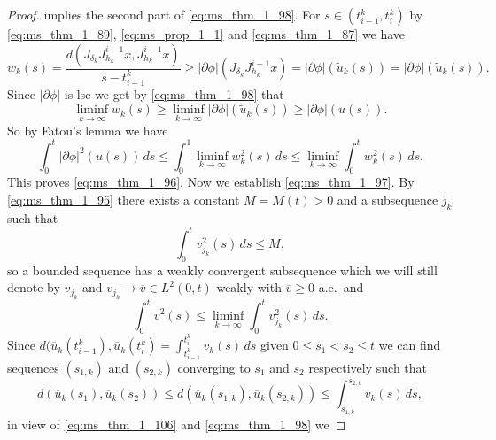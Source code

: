 \documentclass[a4paper,11pt, leqno]{scrreprt} %
\renewcommand{\leq}{\leqslant}
\renewcommand{\leq}{\leqslant}
\renewcommand{\geq}{\geqslant}
\theoremstyle{change}
\theoremstyle{nonumberplain}
\newtheorem{proof}{Proof}
\begin{document}
\begin{proof}
  implies the second part of \eqref{eq:ms_thm_1_98}. For $s \in (t_{i
    - 1}^k, t_i^k)$ by \eqref{eq:ms_thm_1_89}, \eqref{eq:ms_prop_1_1}
  and \eqref{eq:ms_thm_1_87} we have
  \begin{equation}
    \label{eq:ms_thm_1_103}
    w_k(s) = \frac{d(J_{\delta_k} J_{h_k}^{i - 1} x, J_{h_k}^{i - 1} x)}{s - t_{i -
        1}^k} \geq |\partial \phi|(J_{\delta_k} J_{h_k}^{i - 1} x) =
    |\partial \phi|(\tilde u_k(s)) = |\partial \phi|(\tilde u_k(s)).
  \end{equation}
  Since $|\partial \phi|$ is lsc we get by \eqref{eq:ms_thm_1_98} that 
  \begin{equation}
    \label{eq:ms_thm_1_104}
    \liminf_{k \to \infty} w_k(s) \geq \liminf_{k \to \infty}
    |\partial \phi|(\tilde u_k(s)) \geq |\partial \phi|(u(s)).
  \end{equation}
  So by Fatou's lemma we have
  \begin{equation}
    \label{eq:ms_thm_1_105}
    \int_0^t |\partial \phi|^2(u(s)) \, ds \leq \int_0^1 \liminf_{k
      \to \infty} w_k^2(s) \, ds \leq \liminf_{k \to \infty} \int_0^t
    w_k^2(s) \, ds.
  \end{equation}
  This proves \eqref{eq:ms_thm_1_96}. Now we establish
  \eqref{eq:ms_thm_1_97}. By \eqref{eq:ms_thm_1_95} there exists a
  constant $M = M(t) > 0$ and a subsequence $j_k$ such that
  \begin{equation}
    \label{eq:ms_thm_1_106}
    \int_0^t v_{j_k}^2(s) \, ds \leq M,
  \end{equation}
  so a bounded sequence has a weakly convergent subsequence which we
  will still denote by $v_{j_k}$ and $v_{j_k} \to \overline v \in
  L^2(0,t)$ weakly with $\overline v \geq 0$ a.e.\, and
  \begin{equation}
    \label{eq:ms_thm_1_107}
    \int_0^t \overline v^2(s) \leq \liminf_{k \to \infty} \int_0^t
    v_{j_k}^2(s) \, ds.
  \end{equation}
  Since $d(\overline u_k(t_{i - 1}^k), \overline u_k(t_i^k) =
  \int_{t_{i - 1}^k}^{t_i^k} v_k(s) \, ds$ given $0 \leq s_1 < s_2
  \leq t$ we can find sequences $(s_{1, k})$ and $(s_{2, k})$
  converging to $s_1$ and $s_2$ respectively such that
  \begin{equation}
    \label{eq:ms_thm_1_108}
    d(\overline u_k(s_1), \overline u_k(s_2)) \leq d(\overline
    u_k(s_{1, k}), \overline u_k(s_{2, k})) \leq \int_{s_{1,
        k}}^{s_{2, k}} v_k(s) \, ds,
  \end{equation}
  in view of \eqref{eq:ms_thm_1_106} and \eqref{eq:ms_thm_1_98} we

\end{proof}
\end{document}
